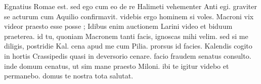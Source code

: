 


 Egnatius Romae est. sed ego cum eo de re Halimeti vehementer Anti egi. graviter se acturum cum Aquilio confirmavit. videbis ergo hominem si voles. Macroni vix videor praesto esse posse ; Idibus enim auctionem Larini video et biduum praeterea. id tu, quoniam Macronem tanti facis, ignoscas mihi velim. sed si me diligis, postridie Kal. cena apud me cum Pilia. prorsus id facies. Kalendis cogito in hortis Crassipedis quasi in deversorio cenare. facio fraudem senatus consulto. inde domum cenatus, ut sim mane praesto Miloni. ibi te igitur videbo et permanebo. domus te nostra tota salutat.
